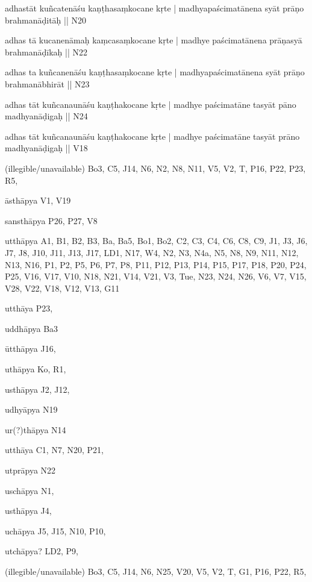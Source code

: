 \begin{ekdosis}
\begin{marma}[hp01_055]
\begin{marma}[hp02_009]
\begin{marma}[hp02_011]
\begin{marma}[hp02_46]
\item[adhastāt kuñcatenāśu kaṇṭhasaṃkocane kṛte | madhyapaścimatānena syāt prāṇo brahmanāḍitāḥ ||] N20
\item[adhas tā kucanenāmaḥ kaṃcasaṃkocane kṛte | madhye paścimatānena prāṇasyā brahmanāḍīkaḥ ||] N22
\item[adhas ta kuñcanenāśu kaṇṭhasaṃkocane kṛte | madhyapaścimatānena syāt prāṇo brahmanābhirāt ||] N23
\item[adhas tāt kuñcanaunāśu kaṇṭhakocane kṛte | madhye paścimatāne tasyāt pāno madhyanāḍigaḥ ||] N24
\item[adhas tāt kuñcanaunāśu kaṇṭhakocane kṛte | madhye paścimatāne tasyāt prāno madhyanāḍigaḥ ||] V18
\item[(illegible/unavailable)] Bo3, C5, J14, N6, N2, N8, N11, V5, V2, T, P16, P22, P23, R5,
  \begin{description}

    \end{description}
 \end{marma}

 \begin{marma}[hp02_48b]
\item[āsthāpya] V1, V19
\item[sansthāpya] P26, P27, V8
\item[utthāpya] A1, B1, B2, B3, Ba, Ba5, Bo1, Bo2, C2, C3, C4, C6, C8, C9, J1, J3, J6, J7, J8, J10, J11, J13, J17, LD1, N17, W4, N2, N3, N4a, N5, N8, N9, N11, N12, N13, N16, P1, P2, P5, P6, P7, P8, P11, P12, P13, P14, P15, P17, P18, P20, P24, P25, V16, V17, V10, N18, N21, V14, V21, V3, Tue, N23, N24, N26, V6, V7, V15, V28, V22, V18, V12, V13, G11
\item[utthāya] P23,
\item[uddhāpya] Ba3
\item[ūtthāpya] J16,
\item[uthāpya] Ko, R1, 
\item[usthāpya] J2, J12, 
\item[udhyāpya] N19
\item[ur(?)thāpya] N14
\item[utthāya] C1, N7, N20, P21, 
\item[utprāpya] N22
\item[uschāpya] N1, 
\item[usthāpya] J4,
\item[uchāpya] J5, J15, N10, P10, 
\item[utchāpya?] LD2, P9, 
\item[(illegible/unavailable)] Bo3, C5, J14, N6, N25, V20, V5, V2, T, G1, P16, P22, R5,


\end{marma}
\end{marma}
\end{marma}
\end{marma}
\end{ekdosis}
